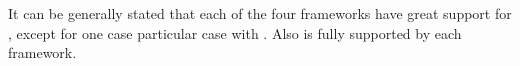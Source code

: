 \documentclass[a4paper]{artikel3}
\newcommand{\code}[1]{\texttt{#1}}
\newcommand{\setspace}[0]{\vspace{2mm}}
\renewcommand{\paragraph}[1]{\setspace \noindent {\bf #1}  }
\newcommand{\framework}[2]{ \emph{#1 (\textbf{#2}): }} %
\newcommand{\challenge}[1]{\paragraph{#1}}
\begin{document}
It can be generally stated that each of the four frameworks have great support for , except for one case particular case with \lungo{}.
Also  is fully supported by each framework.


%
%
%
%
\end{document}
